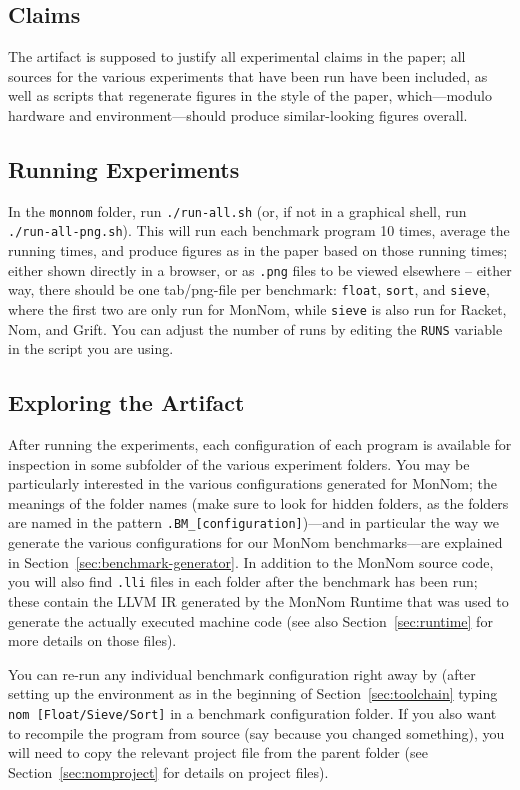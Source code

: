 \documentclass{article}
\newcommand{\refsec}[1]{Section~\ref{sec:#1}}
\begin{document}
\subsection{Claims}
The artifact is supposed to justify all experimental claims in the paper; all sources for the various experiments that have been run have been included, as well as scripts that regenerate figures in the style of the paper, which---modulo hardware and environment---should produce similar-looking figures overall.

\subsection{Running Experiments}
In the \texttt{monnom} folder, run \texttt{./run-all.sh} (or, if not in a graphical shell, run \texttt{./run-all-png.sh}).
This will run each benchmark program 10 times, average the running times, and produce figures as in the paper based on those running times; either shown directly in a browser, or as \texttt{.png} files to be viewed elsewhere -- either way, there should be one tab/png-file per benchmark: \texttt{float}, \texttt{sort}, and \texttt{sieve}, where the first two are only run for MonNom, while \texttt{sieve} is also run for Racket, Nom, and Grift.
You can adjust the number of runs by editing the \texttt{RUNS} variable in the script you are using.

\subsection{Exploring the Artifact}
After running the experiments, each configuration of each program is available for inspection in some subfolder of the various experiment folders.
You may be particularly interested in the various configurations generated for MonNom; the meanings of the folder names (make sure to look for hidden folders, as the folders are named in the pattern \texttt{.BM\_[configuration]})---and in particular the way we generate the various configurations for our MonNom benchmarks---are explained in \refsec{benchmark-generator}.
In addition to the MonNom source code, you will also find \texttt{.lli} files in each folder after the benchmark has been run; these contain the LLVM IR generated by the MonNom Runtime that was used to generate the actually executed machine code (see also \refsec{runtime} for more details on those files).

You can re-run any individual benchmark configuration right away by (after setting up the environment as in the beginning of \refsec{toolchain} typing \texttt{nom [Float/Sieve/Sort]} in a benchmark configuration folder.
If you also want to recompile the program from source (say because you changed something), you will need to copy the relevant project file from the parent folder (see \refsec{nomproject} for details on project files).
\end{document}
